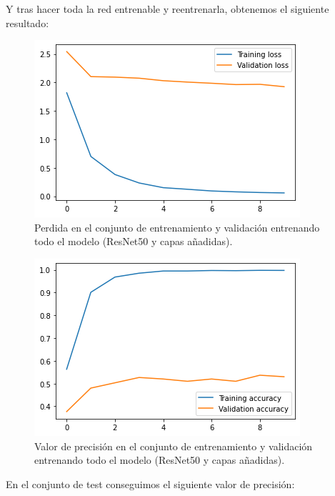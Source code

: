 \documentclass[12pt, spanish]{article}
\begin{document}
Y tras hacer toda la red entrenable y reentrenarla, obtenemos el siguiente resultado:


\begin{figure}[H]
  \centering
      \includegraphics[width=\textwidth]{3-2-1.png}
		\caption{Perdida en el conjunto de entrenamiento y validación entrenando todo el modelo (ResNet50 y capas añadidas).}
\end{figure}

\begin{figure}[H]
  \centering
      \includegraphics[width=\textwidth]{3-2-2.png}
		\caption{Valor de precisión en el conjunto de entrenamiento y validación entrenando todo el modelo (ResNet50 y capas añadidas).}
\end{figure}



En el conjunto de test conseguimos el siguiente valor de precisión:
\end{document}
